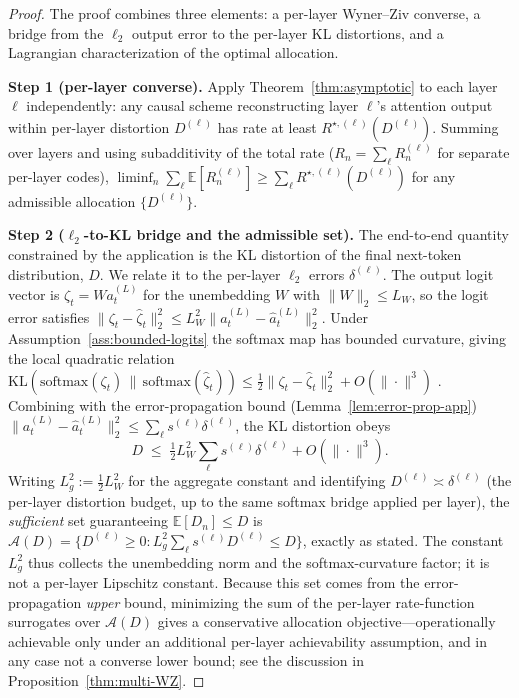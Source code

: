 \documentclass[11pt]{article}
\newcommand{\E}{\mathbb{E}}
\newcommand{\KLs}{\mathrm{KL}}
\theoremstyle{plain}
\theoremstyle{definition}
\theoremstyle{remark}
\begin{document}
\begin{proof}
The proof combines three elements: a per-layer Wyner--Ziv converse,
a bridge from the $\ell_2$ output error to the per-layer KL
distortions, and a Lagrangian characterization of the optimal
allocation.

\textbf{Step 1 (per-layer converse).} Apply
Theorem~\ref{thm:asymptotic} to each layer $\ell$ independently:
any causal scheme reconstructing layer $\ell$'s attention output
within per-layer distortion $D^{(\ell)}$ has rate at least
$R^{\star,(\ell)}(D^{(\ell)})$. Summing over layers and using
subadditivity of the total rate
($R_n = \sum_\ell R_n^{(\ell)}$ for separate per-layer codes),
$\liminf_n \sum_\ell \E[R_n^{(\ell)}] \geq \sum_\ell
R^{\star,(\ell)}(D^{(\ell)})$ for any admissible allocation
$\{D^{(\ell)}\}$.

\textbf{Step 2 ($\ell_2$-to-KL bridge and the admissible set).}
The end-to-end quantity constrained by the application is the KL
distortion of the final next-token distribution, $D$. We relate it
to the per-layer $\ell_2$ errors $\delta^{(\ell)}$. The output
logit vector is $\zeta_t = W a_t^{(L)}$ for the unembedding $W$ with
$\|W\|_2 \leq L_W$, so the logit error satisfies
$\|\zeta_t - \hat\zeta_t\|_2^2 \leq L_W^2 \|a_t^{(L)} - \hat
a_t^{(L)}\|_2^2$. Under Assumption~\ref{ass:bounded-logits} the
softmax map has bounded curvature, giving the local quadratic
relation
$\KLs(\mathrm{softmax}(\zeta_t)\,\|\,\mathrm{softmax}(\hat\zeta_t))
\leq \tfrac12 \|\zeta_t - \hat\zeta_t\|_2^2 + O(\|\cdot\|^3)$
\citep[the softmax Fisher metric is the logit covariance, bounded
under][]{cover2006elements}. Combining with the error-propagation
bound (Lemma~\ref{lem:error-prop-app})
$\|a_t^{(L)} - \hat a_t^{(L)}\|_2^2 \leq \sum_\ell s^{(\ell)}
\delta^{(\ell)}$, the KL distortion obeys
\[
D \;\leq\; \tfrac12 L_W^2 \sum_\ell s^{(\ell)} \delta^{(\ell)}
  + O(\|\cdot\|^3).
\]
Writing $L_g^2 := \tfrac12 L_W^2$ for the aggregate constant and
identifying $D^{(\ell)} \asymp \delta^{(\ell)}$ (the per-layer
distortion budget, up to the same softmax bridge applied
per layer), the \emph{sufficient} set guaranteeing $\E[D_n]\le D$ is
$\mathcal{A}(D) = \{D^{(\ell)} \geq 0 : L_g^2 \sum_\ell s^{(\ell)}
D^{(\ell)} \leq D\}$, exactly as stated. The constant $L_g^2$ thus
collects the unembedding norm and the softmax-curvature factor; it
is not a per-layer Lipschitz constant. Because this set comes from
the error-propagation \emph{upper} bound, minimizing the sum of the
per-layer rate-function surrogates over $\mathcal{A}(D)$ gives a
conservative allocation objective---operationally achievable only
under an additional per-layer achievability assumption, and in any
case not a converse lower bound; see the discussion in
Proposition~\ref{thm:multi-WZ}.


\end{proof}
\end{document}
